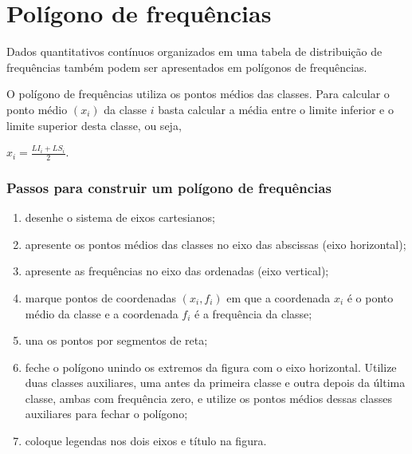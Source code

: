 \documentclass[11pt,fleqn]{book} %
\begin{document}
\section{Polígono de frequências}

Dados quantitativos contínuos organizados em uma tabela de distribuição de frequências também podem ser apresentados em polígonos de frequências. 

O polígono de frequências utiliza os pontos médios das classes. Para calcular o ponto médio $(x_i)$ da classe $i$ basta calcular a média entre o limite inferior e o limite superior desta classe, ou seja, 

\begin{center}
$\displaystyle x_i=\frac{LI_i+LS_i}{2}$. \\
\end{center}


\subsubsection{Passos para construir um polígono de frequências}

\begin{enumerate}

	\item desenhe o sistema de eixos cartesianos;
	\item apresente os pontos médios das classes no eixo das abscissas (eixo horizontal);
	\item apresente as frequências no eixo das ordenadas (eixo vertical);
	\item marque pontos de coordenadas $(x_i,f_i)$ em que a coordenada $x_i$ é o ponto médio da classe e a coordenada $f_i$ é a frequência da classe;
	\item una os pontos por segmentos de reta;
	\item feche o polígono unindo os extremos da figura com o eixo horizontal. Utilize duas classes auxiliares, uma antes da primeira classe e outra depois da última classe, ambas com frequência zero, e utilize os pontos médios dessas classes auxiliares para fechar o polígono;
	\item coloque legendas nos dois eixos e título na figura. \\

\end{enumerate}
\end{document}
